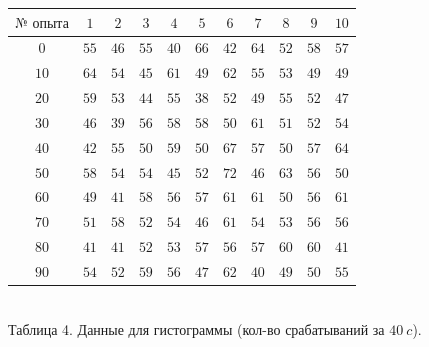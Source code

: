 \documentclass[a4paper,12pt]{article} %
\begin{document}
\begin{tabular}{ | c | c | c | c | c | c | c | c | c | c | c |}
\hline
$\textbf{№ опыта}$ & $1$ & $2$ & $3$ & $4$ & $5$ & $6$ & $7$ & $8$ & $9$ & $10$\\ \hline
$0$ & $55$ & $46$ & $55$ & $40$ & $66$ & $42$ & $64$ & $52$ & $58$ & $57$\\ \hline
$10$ & $64$ & $54$ & $45$ & $61$ & $49$ & $62$ & $55$ & $53$ & $49$ & $49$ \\ \hline
$20$ & $59$ & $53$ & $44$ & $55$ & $38$ & $52$ & $49$ & $55$ & $52$ & $47$ \\ \hline
$30$ & $46$ & $39$ & $56$ & $58$ & $58$ & $50$ & $61$ & $51$ & $52$ & $54$ \\ \hline
$40$ & $42$ & $55$ & $50$ & $59$ & $50$ & $67$ & $57$ & $50$ & $57$ & $64$ \\ \hline
$50$ & $58$ & $54$ & $54$ & $45$ & $52$ & $72$ & $46$ & $63$ & $56$ & $50$ \\ \hline
$60$ & $49$ & $41$ & $58$ & $56$ & $57$ & $61$ & $61$ & $50$ & $56$ & $61$ \\ \hline
$70$ & $51$ & $58$ & $52$ & $54$ & $46$ & $61$ & $54$ & $53$ & $56$ & $56$ \\ \hline
$80$ & $41$ & $41$ & $52$ & $53$ & $57$ & $56$ & $57$ & $60$ & $60$ & $41$ \\ \hline
$90$ & $54$ & $52$ & $59$ & $56$ & $47$ & $62$ & $40$ & $49$ & $50$ & $55$ \\

\hline 
\end{tabular}\\


\newpage
Таблица 4. Данные для гистограммы (кол-во срабатываний за $40\ c$).
\end{document}

